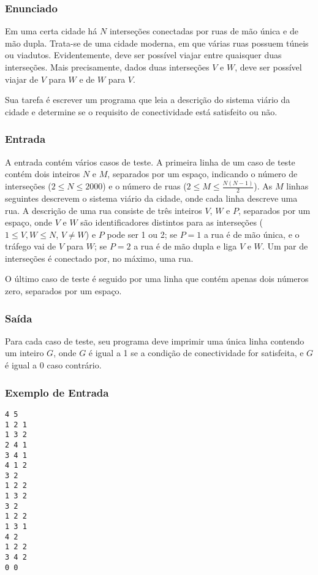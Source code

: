 \subsubsection*{Enunciado}
Em uma certa cidade há \(N\) interseções conectadas por ruas de mão única e de mão dupla. Trata-se de uma cidade moderna, em que várias ruas possuem túneis ou viadutos. Evidentemente, deve ser possível viajar entre quaisquer duas interseções. Mais precisamente, dados duas interseções \(V\) e \(W\), deve ser possível viajar de \(V\) para \(W\) e de \(W\) para \(V\).

Sua tarefa é escrever um programa que leia a descrição do sistema viário da cidade e determine se o requisito de conectividade está satisfeito ou não.

\subsubsection*{Entrada}
A entrada contém vários casos de teste. A primeira linha de um caso de teste contém dois inteiros \(N\) e \(M\), separados por um espaço, indicando o número de interseções (\(2 \le N \le 2000\)) e o número de ruas (\(2 \le M \le \frac{N(N-1)}{2}\)). As \(M\) linhas seguintes descrevem o sistema viário da cidade, onde cada linha descreve uma rua. A descrição de uma rua consiste de três inteiros \(V\), \(W\) e \(P\), separados por um espaço, onde \(V\) e \(W\) são identificadores distintos para as interseções (\(1 \le V, W \le N\), \(V \neq W\)) e \(P\) pode ser 1 ou 2; se \(P = 1\) a rua é de mão única, e o tráfego vai de \(V\) para \(W\); se \(P = 2\) a rua é de mão dupla e liga \(V\) e \(W\). Um par de interseções é conectado por, no máximo, uma rua.

O último caso de teste é seguido por uma linha que contém apenas dois números zero, separados por um espaço.

\subsubsection*{Saída}
Para cada caso de teste, seu programa deve imprimir uma única linha contendo um inteiro \(G\), onde \(G\) é igual a 1 se a condição de conectividade for satisfeita, e \(G\) é igual a 0 caso contrário.

\subsubsection*{Exemplo de Entrada}
\begin{verbatim}
4 5
1 2 1
1 3 2
2 4 1
3 4 1
4 1 2
3 2
1 2 2
1 3 2
3 2
1 2 2
1 3 1
4 2
1 2 2
3 4 2
0 0
\end{verbatim}


